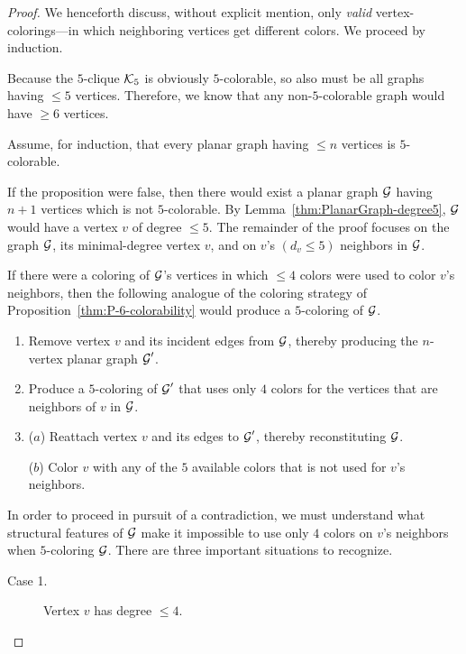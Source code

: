 \begin{proof}
We henceforth discuss, without explicit mention, only {\em valid} vertex-colorings---in which neighboring vertices get different colors.  We proceed by induction.

\medskip

Because the $5$-clique $\mbox{$\cal K$}_5$ is obviously $5$-colorable, so also must be all graphs having $\leq 5$ vertices.  Therefore, we know that any non-$5$-colorable graph would have $\geq 6$ vertices.

\medskip

Assume, for induction, that every planar graph having $\leq n$ vertices is $5$-colorable.

\medskip

If the proposition were false, then there would exist a planar graph $\mbox{$\cal G$}$ having $n+1$ vertices which is not $5$-colorable.  By Lemma~\ref{thm:PlanarGraph-degree5}, $\mbox{$\cal G$}$ would have a vertex $v$ of degree $\leq 5$.  The remainder of the proof focuses on the graph $\mbox{$\cal G$}$, its minimal-degree vertex $v$, and on $v$'s $(d_v \leq 5)$ neighbors in $\mbox{$\cal G$}$.

\smallskip

If there were a coloring of $\mbox{$\cal G$}$'s vertices in which $\leq 4$ colors were used to color $v$'s neighbors, then the following analogue of the coloring strategy of Proposition~\ref{thm:P-6-colorability} would produce a $5$-coloring of $\mbox{$\cal G$}$.
\begin{enumerate}
\item
Remove vertex $v$ and its incident edges from $\mbox{$\cal G$}$, thereby producing the $n$-vertex planar graph $\mbox{$\cal G$}'$.
\medskip\item
Produce a $5$-coloring of $\mbox{$\cal G$}'$ that uses only $4$ colors for the vertices that are neighbors of $v$ in $\mbox{$\cal G$}$.
\medskip\item
($a$) Reattach vertex $v$ and its edges to $\mbox{$\cal G$}'$, thereby reconstituting $\mbox{$\cal G$}$.

\smallskip

($b$) Color $v$ with any of the $5$ available colors that is not used for $v$'s neighbors.
\end{enumerate}

\smallskip

In order to proceed in pursuit of a contradiction, we must understand what structural features of $\mbox{$\cal G$}$ make it impossible to use only $4$ colors on $v$'s neighbors when $5$-coloring $\mbox{$\cal G$}$.  There are three important situations to recognize.
\begin{description}
\item[{\sf Case 1}.]
Vertex $v$ has degree $\leq 4$.


\end{description}
\end{proof}

